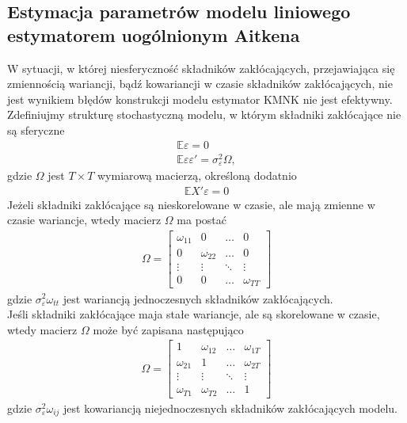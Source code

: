 \subsection{Estymacja parametrów modelu liniowego estymatorem uogólnionym Aitkena}
W sytuacji, w której niesferyczność składników zakłócających, przejawiająca się zmiennością wariancji, bądź kowariancji w czasie składników zakłócających, nie jest wynikiem błędów konstrukcji modelu estymator KMNK nie jest efektywny.
Zdefiniujmy strukturę stochastyczną modelu, w którym składniki zakłócające nie są sferyczne
\begin{gather*}
\mathbb E \varepsilon=0\\
\mathbb E \varepsilon\varepsilon'=\sigma^2_\varepsilon\Omega,
\end{gather*}
gdzie $ \Omega $ jest $ T\times T $ wymiarową macierzą, określoną dodatnio
\begin{gather*}
\mathbb E X'\varepsilon=0
\end{gather*}
Jeżeli składniki zakłócające są nieskorelowane w czasie, ale mają zmienne w czasie wariancje, wtedy macierz $ \Omega $ ma postać
\begin{gather*}
\Omega=\begin{bmatrix}
	\omega _{11} & 0            & \ldots & 0            \\
	0            & \omega _{22} & \ldots & 0            \\
	\vdots       & \vdots       & \ddots & \vdots       \\
	0            & 0            & \ldots & \omega _{TT}
\end{bmatrix}
\end{gather*}
gdzie $ \sigma^2_\varepsilon\omega_{tt} $ jest wariancją jednoczesnych składników zakłócających.\\
Jeśli składniki zakłócające maja stałe wariancje, ale są skorelowane w czasie, wtedy macierz $ \Omega $ może być zapisana następująco
\begin{gather*}
\Omega=\begin{bmatrix}
	1            & \omega _{12} & \ldots & \omega _{1T} \\
	\omega _{21} & 1            & \ldots & \omega _{2T} \\
	\vdots       & \vdots       & \ddots & \vdots       \\
	\omega _{T1} & \omega _{T2} & \ldots & 1
\end{bmatrix}
\end{gather*}
gdzie $ \sigma^2_\varepsilon\omega_{ij} $ jest kowariancją niejednoczesnych składników zakłócających modelu.\\
